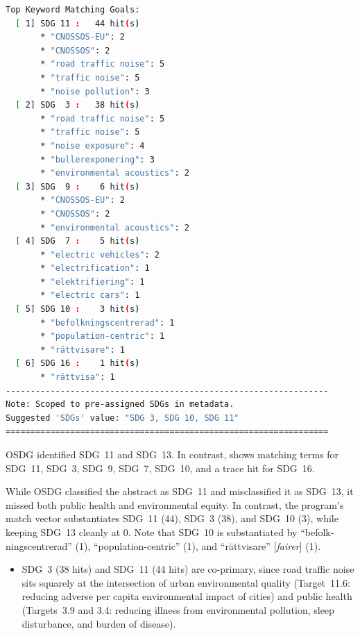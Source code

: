 \begin{casestudySection}
\begin{lstlisting}[language={bash}, basicstyle=\footnotesize, escapechar=|, breaklines=true,
    postbreak=\usebox{\lstbreakbox}, caption={Program's output}, label=lst:t_150949Output]
Top Keyword Matching Goals:
  [ 1] SDG 11 :   44 hit(s)
       * "CNOSSOS-EU": 2
       * "CNOSSOS": 2
       * "road traffic noise": 5
       * "traffic noise": 5
       * "noise pollution": 3
  [ 2] SDG  3 :   38 hit(s)
       * "road traffic noise": 5
       * "traffic noise": 5
       * "noise exposure": 4
       * "bullerexponering": 3
       * "environmental acoustics": 2
  [ 3] SDG  9 :    6 hit(s)
       * "CNOSSOS-EU": 2
       * "CNOSSOS": 2
       * "environmental acoustics": 2
  [ 4] SDG  7 :    5 hit(s)
       * "electric vehicles": 2
       * "electrification": 1
       * "elektrifiering": 1
       * "electric cars": 1
  [ 5] SDG 10 :    3 hit(s)
       * "befolkningscentrerad": 1
       * "population-centric": 1
       * "rättvisare": 1
  [ 6] SDG 16 :    1 hit(s)
       * "rättvisa": 1
-----------------------------------------------------------------
Note: Scoped to pre-assigned SDGs in metadata.
Suggested 'SDGs' value: "SDG 3, SDG 10, SDG 11"
=================================================================
\end{lstlisting}

OSDG identified \gls{SDG}~11 and \gls{SDG}~13. In contrast,  shows matching terms for \gls{SDG}~11, \gls{SDG}~3, \gls{SDG}~9, \gls{SDG}~7, \gls{SDG}~10, and a trace hit for \gls{SDG}~16.

While OSDG classified the abstract as \gls{SDG}~11 and misclassified it as \gls{SDG}~13, it missed both public health and environmental equity. In contrast, the program's match vector substantiates \gls{SDG}~11 (\num{44}), \gls{SDG}~3 (\num{38}), and \gls{SDG}~10 (\num{3}), while keeping \gls{SDG}~13 cleanly at \num{0}. Note that \gls{SDG}~10 is substantiated by \enquote{\foreignlanguage{swedish}{befolkningscentrerad}} (1), \enquote{population-centric} (1), and \enquote{\foreignlanguage{swedish}{rättvisare}} [\emph{fairer}] (1).
\begin{itemize}
    \item \gls{SDG}~3 (\num{38} hits) and \gls{SDG}~11 (\num{44} hits) are co-primary, since road traffic noise sits squarely at the intersection of urban environmental quality (Target~11.6: reducing adverse per capita environmental impact of cities) and public health (Targets~3.9 and 3.4: reducing illness from environmental pollution, sleep disturbance, and burden of disease).


\end{itemize}
\end{casestudySection}
